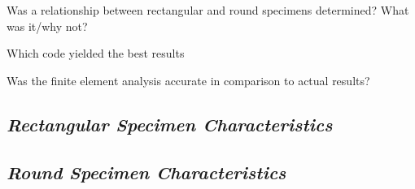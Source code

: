 \documentclass[11pt,a4paper]{article}
\numberwithin{equation}{subsection}
\begin{document}
\vspace*{\baselineskip}
\noindent Was a relationship between rectangular and round specimens determined? What was it/why not?\par

\vspace*{\baselineskip}
\noindent Which code yielded the best results\par

\vspace*{\baselineskip}
\noindent Was the finite element analysis accurate in comparison to actual results?\par

\pagebreak	




\pagebreak
\cleardoublepage
{}

\appendixtitleon

\begin{appendices}
	\section{\textit{Rectangular Specimen Characteristics}}
\pagebreak

\end{appendices}

\begin{appendices}
	\section{\textit{Round Specimen Characteristics}}
	\pagebreak
	
\end{appendices}
\end{document}
